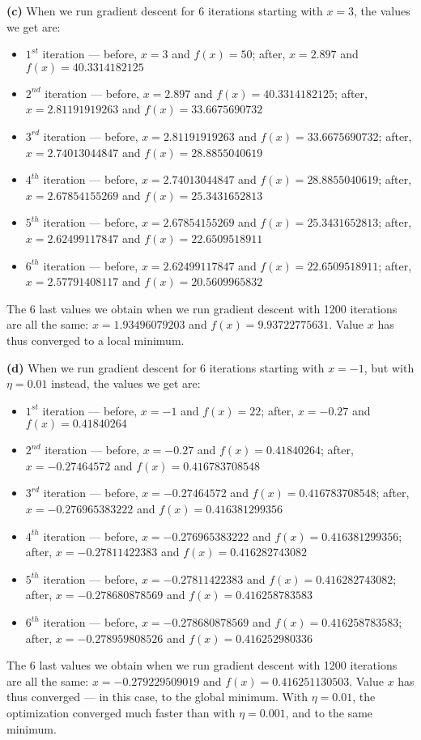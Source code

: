 \documentclass[leqno]{article}
\begin{document}
\noindent \textbf{(c)} When we run gradient descent for 6 iterations starting with $x = 3$, the values we get are:
\begin{itemize}
\item $1^{st}$ iteration --- before, $x = 3$ and $f(x) = 50$; after, $x = 2.897$ and $f(x) = 40.3314182125$
\item $2^{nd}$ iteration --- before, $x = 2.897$ and $f(x) = 40.3314182125$; after, $x = 2.81191919263$ and $f(x) = 33.6675690732$
\item $3^{rd}$ iteration --- before, $x = 2.81191919263$ and $f(x) = 33.6675690732$; after, $x = 2.74013044847$ and $f(x) = 28.8855040619$
\item $4^{th}$ iteration --- before, $x = 2.74013044847$ and $f(x) = 28.8855040619$; after, $x = 2.67854155269$ and $f(x) = 25.3431652813$
\item $5^{th}$ iteration --- before, $x = 2.67854155269$ and $f(x) = 25.3431652813$; after, $x = 2.62499117847$ and $f(x) = 22.6509518911$
\item $6^{th}$ iteration --- before, $x = 2.62499117847$ and $f(x) = 22.6509518911$; after, $x = 2.57791408117$ and $f(x) = 20.5609965832$  
\end{itemize}  
The 6 last values we obtain when we run gradient descent with 1200 iterations are all the same:
$x = 1.93496079203$ and $f(x) = 9.93722775631$. Value $x$ has thus converged to a local minimum.

\hfill

\noindent \textbf{(d)} When we run gradient descent for 6 iterations starting with $x = -1$, but with $\eta = 0.01$ instead, the values we get are:
\begin{itemize}
\item $1^{st}$ iteration --- before, $x = -1$ and $f(x) = 22$; after, $x = -0.27$ and $f(x) = 0.41840264$
\item $2^{nd}$ iteration --- before, $x = -0.27$ and $f(x) = 0.41840264$; after, $x = -0.27464572$ and $f(x) = 0.416783708548$
\item $3^{rd}$ iteration --- before, $x = -0.27464572$ and $f(x) = 0.416783708548$; after, $x = -0.276965383222$ and $f(x) = 0.416381299356$
\item $4^{th}$ iteration --- before, $x = -0.276965383222$ and $f(x) = 0.416381299356$; after, $x = -0.27811422383$ and $f(x) = 0.416282743082$
\item $5^{th}$ iteration --- before, $x = -0.27811422383$ and $f(x) = 0.416282743082$; after, $x = -0.278680878569$ and $f(x) = 0.416258783583$
\item $6^{th}$ iteration --- before, $x = -0.278680878569$ and $f(x) = 0.416258783583$; after, $x = -0.278959808526$ and $f(x) = 0.416252980336$  
\end{itemize}  
The 6 last values we obtain when we run gradient descent with 1200 iterations are all the same:
$x = -0.279229509019$ and $f(x) = 0.416251130503$. Value $x$ has thus converged --- in this case, to the global minimum.
With $\eta = 0.01$, the optimization converged much faster than with $\eta = 0.001$, and to the same minimum.
\end{document}
